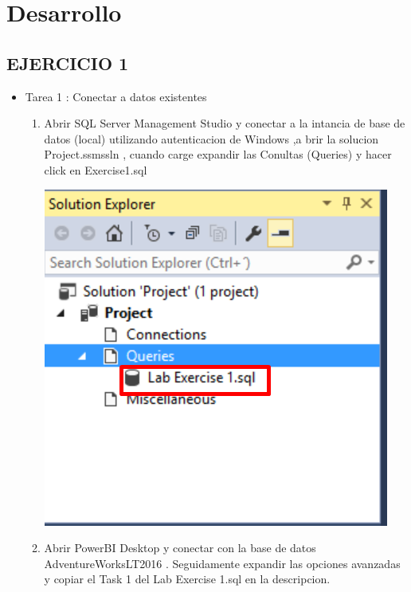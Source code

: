 \section{Desarrollo } 


 \subsection {EJERCICIO 1}

\begin{itemize}
\item Tarea 1 : Conectar a datos existentes


\begin{enumerate}
\item Abrir SQL Server Management Studio y conectar a la intancia de base de datos (local) utilizando autenticacion de Windows ,a brir la solucion Project.ssmssln , cuando carge expandir las Conultas (Queries) y hacer click en Exercise1.sql

\begin{center}
\includegraphics[scale=0.55]{./Imagenes/tarea1_1.png}
\end{center}

\item Abrir PowerBI Desktop y conectar con la base de datos AdventureWorksLT2016 . Seguidamente expandir las opciones avanzadas y copiar el Task 1 del Lab Exercise 1.sql en la descripcion. 



\end{enumerate}
\end{itemize}
